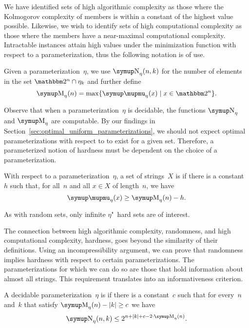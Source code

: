 We have identified sets of high algorithmic complexity as those where the Kolmogorov complexity of members is within a constant of the highest value possible.
Likewise, we wish to identify sets of high computational complexity as those where the members have a near-maximal computational complexity.
Intractable instances attain high values under the minimization function with respect to a parameterization, thus the following notation is of use.
\begin{definition}
  Given a parameterization~$\eta$, we use $\upN_\eta(n, k)$ for the number of elements in the set $\binary^n \cap \eta_k$ and further define
  \begin{equation*}
    \upM_\eta(n) \deq \max\{\mu_\eta(x) \st x \in \binary^n\}.
  \end{equation*}
\end{definition}

Observe that when a parameterization~$\eta$ is decidable, the functions $\upN_\eta$ and $\upM_\eta$ are computable.
By our findings in Section~\ref{sec:optimal_uniform_parameterizations}, we should not expect optimal parameterizations with respect to  to exist for a given set.
Therefore, a parameterized notion of hardness must be dependent on the choice of a parameterization.
\begin{definition}
  With respect to a parameterization~$\eta$, a set of strings~$X$ is  if there is a constant~$h$ such that, for all~$n$ and all $x \in X$ of length~$n$, we have
  \begin{equation*}
    \mu_\eta(x) \ge \upM_\eta(n) - h.
  \end{equation*}
\end{definition}
As with random sets, only infinite $\eta$"~hard sets are of interest.

The connection between high algorithmic complexity, randomness, and high computational complexity, hardness, goes beyond the similarity of their definitions.
Using an incompressibility argument, we can prove that randomness implies hardness with respect to certain parameterizations.
The parameterizations for which we can do so are those that hold information about almost all strings.
This requirement translates into an informativeness criterion.
\begin{definition}
\label{def:informative}%
  A decidable parameterization~$\eta$ is  if there is a constant~$c$ such that for every~$n$ and~$k$ that satisfy $\upM_\eta(n) - \length{k} \ge c$ we have
  \begin{equation*}
    \upN_\eta(n, k) \le 2^{n + \length{k} + c - 2 \cdot \upM_\eta(n)}.
  \end{equation*}
\end{definition}

